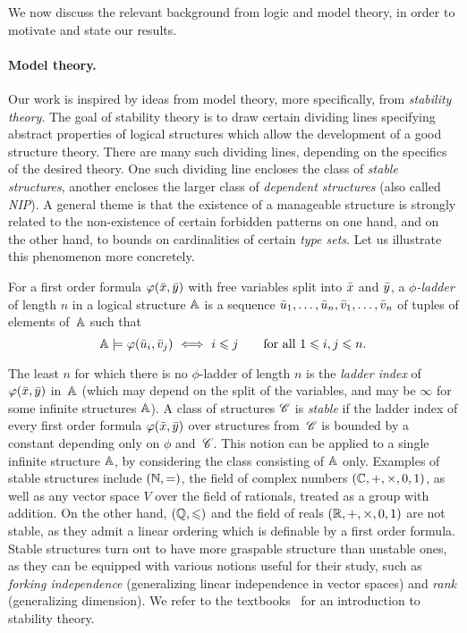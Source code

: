 We now discuss the relevant background from logic and model theory, in order to motivate and state our results.



\paragraph{Model theory.}Our work is inspired by ideas from model theory,  more specifically, from \emph{stability theory}.
  The goal of {stability theory}
  is to draw certain dividing lines
  specifying abstract properties of 
  logical structures which allow the development 
  of a good structure theory. There are many such dividing lines, depending on the specifics of the desired theory. One such dividing line encloses the class of \emph{stable structures}, 
  another encloses the larger class of \emph{dependent structures} (also called \emph{NIP}). 
  A general theme is that the existence of a manageable structure is strongly related to
  the non-existence of certain forbidden patterns on one hand,
and on the other hand, to bounds on cardinalities
of certain \emph{type sets}.  
  Let us illustrate this phenomenon more concretely.

For a first order formula 
$\varphi(\bar{x},\bar{y})$ 
 with free variables
split into  $\bar{x}$ and $\bar{y}$,
a \emph{$\phi$-ladder}
of length $n$ in a logical structure $\mathbb A$ is a sequence $\bar{u}_1,\ldots, \bar{u}_{n},
\bar{v}_1,\ldots, \bar{v}_{n}$ of tuples of elements of~$\mathbb A$ 
such that 
\[\strA\models\phi(\tup{u}_i,\tup{v}_j)\ \Longleftrightarrow\ i\leq j\qquad \text {for all $1\leq i,j\le n$.}\]

The least  $n$ for which 
there is no $\phi$-ladder of length $n$ is 
the \emph{ladder index} 
of $\varphi(\bar{x},\bar{y})$ in~$\mathbb A$ (which may depend on the split of the
variables, and may be $\infty$ for some infinite structures $\mathbb A$). A class of structures $\mathscr{C}$ is \emph{stable} if
the ladder index of every first order formula $\varphi(\bar{x},\bar{y})$ over
structures from~$\mathscr{C}$ is bounded by a constant depending only on $\phi$ 
and~$\mathscr{C}$. This notion can be applied to a single infinite structure $\mathbb A$, by considering the class consisting of $\mathbb A$ only.
Examples of stable structures include $(\mathbb N,=)$,
the field of complex numbers $(\mathbb C,+,\times,0,1)$,
as well as any vector space $V$ over the field of rationals, treated as a group with addition. On the other hand, $(\mathbb Q,\leqslant)$ and the field of reals $(\mathbb R,+,\times,0,1)$ are not stable,
as they admit a linear ordering which is definable by a first order formula.
Stable structures turn out to have more graspable  structure than unstable ones, as they can be equipped with various notions 
useful for their study, such as
\emph{forking independence} (generalizing linear independence in vector spaces)
and \emph{rank} (generalizing dimension).
We refer to the textbooks~\cite{pillay,tent2012course} for an introduction to stability theory.

